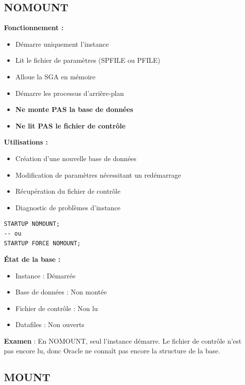 \documentclass[11pt,a4paper]{article}
\begin{document}
\subsection{NOMOUNT}

\textbf{Fonctionnement :}
\begin{itemize}
    \item Démarre uniquement l'instance
    \item Lit le fichier de paramètres (SPFILE ou PFILE)
    \item Alloue la SGA en mémoire
    \item Démarre les processus d'arrière-plan
    \item \textbf{Ne monte PAS la base de données}
    \item \textbf{Ne lit PAS le fichier de contrôle}
\end{itemize}

\textbf{Utilisations :}
\begin{itemize}
    \item Création d'une nouvelle base de données
    \item Modification de paramètres nécessitant un redémarrage
    \item Récupération du fichier de contrôle
    \item Diagnostic de problèmes d'instance
\end{itemize}

\begin{commandebox}
\begin{lstlisting}
STARTUP NOMOUNT;
-- ou
STARTUP FORCE NOMOUNT;
\end{lstlisting}
\end{commandebox}

\textbf{État de la base :}
\begin{itemize}
    \item Instance : Démarrée
    \item Base de données : Non montée
    \item Fichier de contrôle : Non lu
    \item Datafiles : Non ouverts
\end{itemize}

\begin{tipbox}
\textbf{Examen} : En NOMOUNT, seul l'instance démarre. Le fichier de contrôle n'est pas encore lu, donc Oracle ne connaît pas encore la structure de la base.
\end{tipbox}

\subsection{MOUNT}
\end{document}
